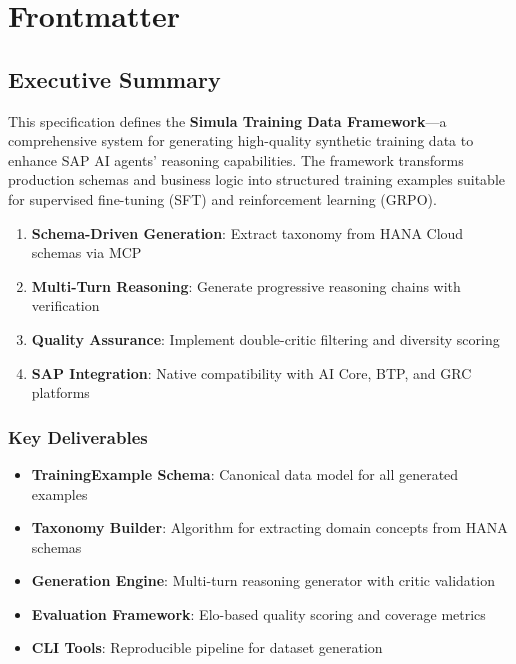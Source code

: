 \chapter*{Frontmatter}

\section*{Executive Summary}

This specification defines the \textbf{Simula Training Data Framework}—a comprehensive system for generating high-quality synthetic training data to enhance SAP AI agents' reasoning capabilities. The framework transforms production schemas and business logic into structured training examples suitable for supervised fine-tuning (SFT) and reinforcement learning (GRPO).

\begin{tcolorbox}[colback=sapblue!10,colframe=sapblue,title=\faIcon{bullseye} Primary Objectives]
\begin{enumerate}[leftmargin=*]
    \item \textbf{Schema-Driven Generation}: Extract taxonomy from HANA Cloud schemas via MCP
    \item \textbf{Multi-Turn Reasoning}: Generate progressive reasoning chains with verification
    \item \textbf{Quality Assurance}: Implement double-critic filtering and diversity scoring
    \item \textbf{SAP Integration}: Native compatibility with AI Core, BTP, and GRC platforms
\end{enumerate}
\end{tcolorbox}

\subsection*{Key Deliverables}

\begin{itemize}
    \item \textbf{TrainingExample Schema}: Canonical data model for all generated examples
    \item \textbf{Taxonomy Builder}: Algorithm for extracting domain concepts from HANA schemas
    \item \textbf{Generation Engine}: Multi-turn reasoning generator with critic validation
    \item \textbf{Evaluation Framework}: Elo-based quality scoring and coverage metrics
    \item \textbf{CLI Tools}: Reproducible pipeline for dataset generation
\end{itemize}

